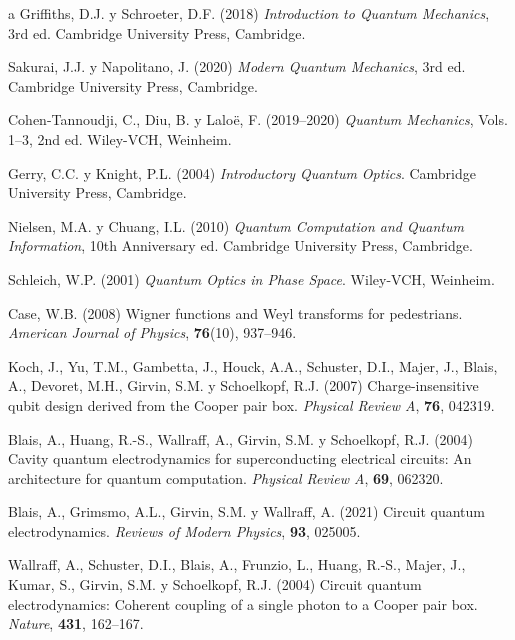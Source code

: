 \documentclass[11pt,a4paper,spanish]{book}
\begin{document}
\begin{thebibliography}{a}
 Griffiths, D.J. y Schroeter, D.F. (2018) \emph{Introduction to Quantum Mechanics}, 3rd ed. Cambridge University Press, Cambridge.

 Sakurai, J.J. y Napolitano, J. (2020) \emph{Modern Quantum Mechanics}, 3rd ed. Cambridge University Press, Cambridge.

 Cohen-Tannoudji, C., Diu, B. y Laloë, F. (2019--2020) \emph{Quantum Mechanics}, Vols. 1--3, 2nd ed. Wiley-VCH, Weinheim.

 Gerry, C.C. y Knight, P.L. (2004) \emph{Introductory Quantum Optics}. Cambridge University Press, Cambridge.

 Nielsen, M.A. y Chuang, I.L. (2010) \emph{Quantum Computation and Quantum Information}, 10th Anniversary ed. Cambridge University Press, Cambridge.

 Schleich, W.P. (2001) \emph{Quantum Optics in Phase Space}. Wiley-VCH, Weinheim.

 Case, W.B. (2008) Wigner functions and Weyl transforms for pedestrians. \textit{American Journal of Physics}, \textbf{76}(10), 937--946.


 Koch, J., Yu, T.M., Gambetta, J., Houck, A.A., Schuster, D.I., Majer, J., Blais, A., Devoret, M.H., Girvin, S.M. y Schoelkopf, R.J. (2007) Charge-insensitive qubit design derived from the Cooper pair box. \textit{Physical Review A}, \textbf{76}, 042319.

 Blais, A., Huang, R.-S., Wallraff, A., Girvin, S.M. y Schoelkopf, R.J. (2004) Cavity quantum electrodynamics for superconducting electrical circuits: An architecture for quantum computation. \textit{Physical Review A}, \textbf{69}, 062320.

 Blais, A., Grimsmo, A.L., Girvin, S.M. y Wallraff, A. (2021) Circuit quantum electrodynamics. \textit{Reviews of Modern Physics}, \textbf{93}, 025005.

 Wallraff, A., Schuster, D.I., Blais, A., Frunzio, L., Huang, R.-S., Majer, J., Kumar, S., Girvin, S.M. y Schoelkopf, R.J. (2004) Circuit quantum electrodynamics: Coherent coupling of a single photon to a Cooper pair box. \textit{Nature}, \textbf{431}, 162--167.


\end{thebibliography}
\end{document}
